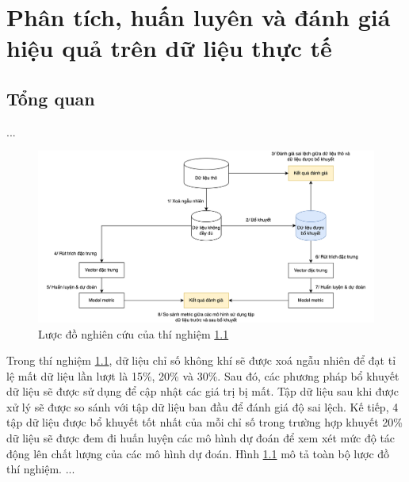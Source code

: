 \chapter{Phân tích, huấn luyên và đánh giá hiệu quả trên dữ liệu thực tế}
\section{Tổng quan}\label{ex-1}
...

\begin{figure}[h]
    \centering
    \includegraphics[width=\linewidth]{image/section6_1/experiment.drawio.png}
    \caption{Lược đồ nghiên cứu của thí nghiệm \ref{ex-1}}
    \label{fig:section6_1-experiment}
\end{figure}
Trong thí nghiệm \ref{ex-1}, dữ liệu chỉ số không khí sẽ được xoá ngẫu nhiên để đạt tỉ lệ mất dữ liệu lần lượt là 15\%, 20\% và 30\%. Sau đó, các phương pháp bổ khuyết dữ liệu sẽ được sử dụng để cập nhật các giá trị bị mất. Tập dữ liệu sau khi được xử lý sẽ được so sánh với tập dữ liệu ban đầu để đánh giá độ sai lệch. Kế tiếp, 4 tập dữ liệu được bổ khuyết tốt nhất của mỗi chỉ số trong trường hợp khuyết 20\% dữ liệu sẽ được đem đi huấn luyện các mô hình dự đoán để xem xét mức độ tác động lên chất lượng của các mô hình dự đoán. Hình \ref{fig:section6_1-experiment} mô tả toàn bộ lược đồ thí nghiệm.
...
